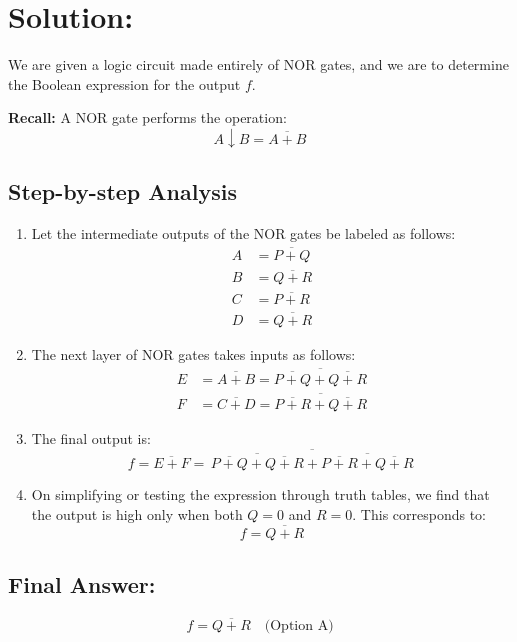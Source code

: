 \documentclass[a4paper,12pt]{article}
\begin{document}
\section*{Solution:}

We are given a logic circuit made entirely of NOR gates, and we are to determine the Boolean expression for the output \( f \).

\vspace{0.5cm}
\textbf{Recall:} A NOR gate performs the operation:
\[
A \downarrow B = \overline{A + B}
\]

\subsection*{Step-by-step Analysis}

\begin{enumerate}
    \item Let the intermediate outputs of the NOR gates be labeled as follows:
    \begin{align*}
    A &= \overline{P + Q} \\
    B &= \overline{Q + R} \\
    C &= \overline{P + R} \\
    D &= \overline{Q + R}
    \end{align*}

    \item The next layer of NOR gates takes inputs as follows:
    \begin{align*}
    E &= \overline{A + B} = \overline{\overline{P + Q} + \overline{Q + R}} \\
    F &= \overline{C + D} = \overline{\overline{P + R} + \overline{Q + R}}
    \end{align*}

    \item The final output is:
    \[
    f = \overline{E + F} = \overline{\,\overline{\overline{P + Q} + \overline{Q + R}} + \overline{\overline{P + R} + \overline{Q + R}}\,}
    \]

    \item On simplifying or testing the expression through truth tables, we find that the output is high only when both \( Q = 0 \) and \( R = 0 \). This corresponds to:
    \[
    f = \overline{Q + R}
    \]
\end{enumerate}

\subsection*{Final Answer:}
\[
\boxed{f = \overline{Q + R}} \quad \text{(Option A)}
\]
\end{document}
